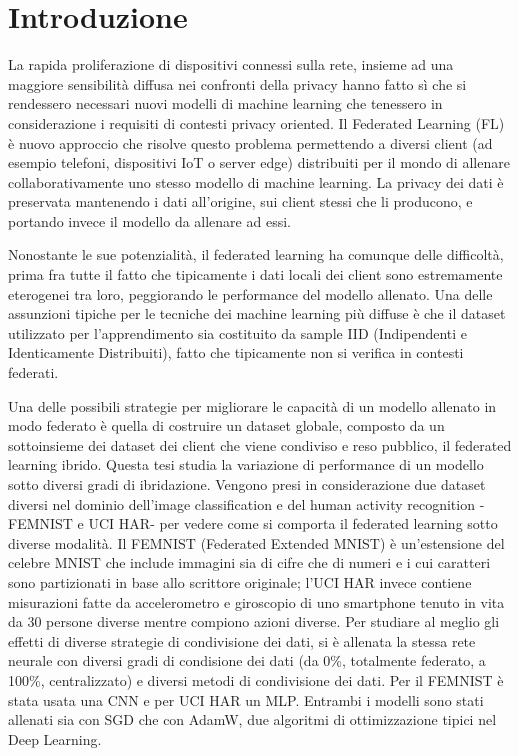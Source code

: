 \chapter*{Introduzione}
La rapida proliferazione di dispositivi connessi sulla rete, insieme 
ad una maggiore sensibilità diffusa nei confronti della privacy 
hanno fatto sì che si rendessero necessari nuovi modelli di machine 
learning che tenessero in considerazione i requisiti di contesti 
privacy oriented. Il Federated Learning (FL) è nuovo approccio che 
risolve questo problema permettendo a diversi client (ad esempio
telefoni, dispositivi IoT o server edge) distribuiti per il mondo di 
allenare collaborativamente uno stesso modello di machine learning. La 
privacy dei dati è preservata mantenendo i dati all'origine, sui 
client stessi che li producono, e portando invece il modello da 
allenare ad essi.

Nonostante le sue potenzialità, il federated learning ha comunque delle
difficoltà, prima fra tutte il fatto che tipicamente i dati locali 
dei client sono estremamente eterogenei tra loro, peggiorando le 
performance del modello allenato. Una delle assunzioni tipiche per le 
tecniche dei machine learning più diffuse è che il dataset utilizzato 
per l'apprendimento sia costituito da sample IID (Indipendenti e 
Identicamente Distribuiti), fatto che tipicamente non si verifica in 
contesti federati.

Una delle possibili strategie per migliorare le capacità di un modello 
allenato in modo federato è quella di costruire un dataset globale, 
composto da un sottoinsieme dei dataset dei client che viene condiviso 
e reso pubblico, il federated learning ibrido. Questa tesi studia la 
variazione di performance di un modello sotto diversi gradi di 
ibridazione. Vengono presi in considerazione due dataset diversi nel 
dominio dell'image classification e del human activity recognition 
-FEMNIST e UCI HAR- per vedere come si comporta il federated 
learning sotto diverse modalità. Il FEMNIST (Federated Extended MNIST)
è un'estensione del celebre MNIST che include immagini sia di cifre 
che di numeri e i cui caratteri sono partizionati in base allo scrittore
originale; l'UCI HAR invece contiene misurazioni fatte 
da accelerometro e giroscopio di uno smartphone tenuto in vita da 30
persone diverse mentre compiono azioni diverse. Per studiare al meglio 
gli effetti di diverse strategie di condivisione dei dati, si è 
allenata la stessa rete neurale con diversi gradi di condisione dei 
dati (da 0\%, totalmente federato, a 100\%, centralizzato) e diversi metodi di 
condivisione dei dati. Per il FEMNIST è stata usata una CNN e per UCI 
HAR un MLP. Entrambi i modelli sono stati allenati sia con SGD che 
con AdamW, due algoritmi di ottimizzazione tipici nel Deep Learning.


